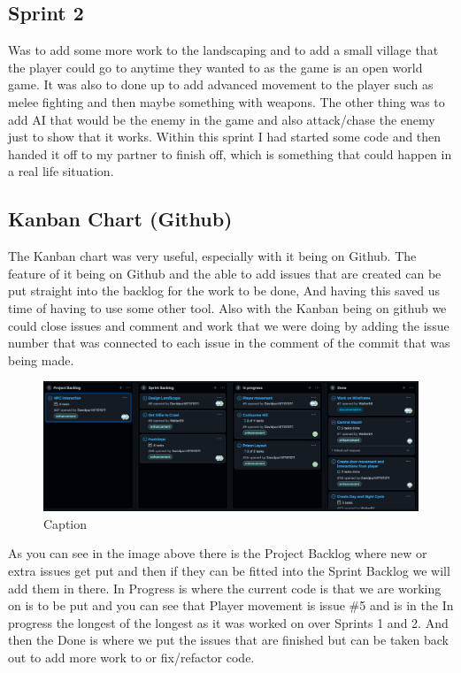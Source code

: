 \subsection{Sprint 2}
Was to add some more work to the landscaping and to add a small village that the player could go to anytime they wanted to as the game is an open world game. It was also to done up to add advanced movement to the player such as melee fighting and then maybe something with weapons. The other thing was to add AI that would be the enemy in the game and also attack/chase the enemy just to show that it works. Within this sprint I had started some code and then handed it off to my partner to finish off, which is something that could happen in a real life situation.

\subsection{Kanban Chart (Github)}
The Kanban chart was very useful, especially with it being on Github. The feature of it being on Github and the able to add issues that are created can be put straight into the backlog for the work to be done, And having this saved us time of having to use some other tool. Also with the Kanban being on github we could close issues and comment and work that we were doing by adding the issue number that was connected to each issue in the comment of the commit that was being made. 
\begin{figure}[H]
    \centering
    \includegraphics[scale=.3]{img/Kanban.png}
    \caption{Caption}
    \label{Kanbad chart}
\end{figure}

As you can see in the image above there is the Project Backlog where new or extra issues get put and then if they can be fitted into the Sprint Backlog we will add them in there. In Progress is where the current code is that we are working on is to be put and you can see that Player movement is issue \#5 and is in the In progress the longest of the longest as it was worked on over Sprints 1 and 2. And then the Done is where we put the issues that are finished but can be taken back out to add more work to or fix/refactor code.
